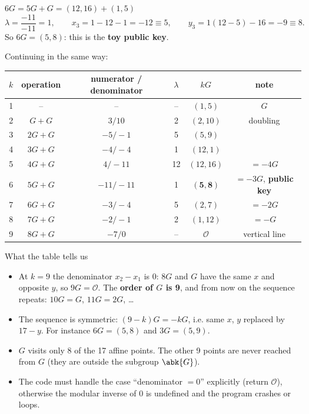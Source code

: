 \begin{framedex}{$6G = 5G + G = (12,16) + (1,5)$}
  \[
    \lambda = \frac{-11}{-11} = 1, \qquad
    x_3 = 1 - 12 - 1 = -12 \equiv 5, \qquad
    y_3 = 1(12 - 5) - 16 = -9 \equiv 8 .
  \]
  So $6G = (5, 8)$: this is the \textbf{toy public key}.
\end{framedex}

Continuing in the same way:

\begin{center}
  \begin{tabular}{c c c c c c}
    \toprule
    $k$ & operation & numerator / denominator & $\lambda$ & $kG$ & note \\
    \midrule
    1 & -- & -- & -- & $(1, 5)$ & $G$ \\
    2 & $G + G$ & $3 / 10$ & 2 & $(2, 10)$ & doubling \\
    3 & $2G + G$ & $-5 / -1$ & 5 & $(5, 9)$ & \\
    4 & $3G + G$ & $-4 / -4$ & 1 & $(12, 1)$ & \\
    5 & $4G + G$ & $4 / -11$ & 12 & $(12, 16)$ & $= -4G$ \\
    6 & $5G + G$ & $-11 / -11$ & 1 & $\mathbf{(5, 8)}$ & $= -3G$, \textbf{public key} \\
    7 & $6G + G$ & $-3 / -4$ & 5 & $(2, 7)$ & $= -2G$ \\
    8 & $7G + G$ & $-2 / -1$ & 2 & $(1, 12)$ & $= -G$ \\
    9 & $8G + G$ & $-7 / 0$ & -- & $\mathcal{O}$ & vertical line \\
    \bottomrule
  \end{tabular}
\end{center}

\begin{framedobs}{What the table tells us}
  \begin{itemize}
    \item At $k = 9$ the denominator $x_2 - x_1$ is $0$: $8G$ and $G$ have the same $x$ and opposite $y$, so $9G = \mathcal{O}$. The \textbf{order of $G$ is 9}, and from now on the sequence repeats: $10G = G$, $11G = 2G$, \ldots
    \item The sequence is symmetric: $(9 - k) G = -kG$, i.e. same $x$, $y$ replaced by $17 - y$. For instance $6G = (5,8)$ and $3G = (5,9)$.
    \item $G$ visits only 8 of the 17 affine points. The other 9 points are never reached from $G$ (they are outside the subgroup $\abk{G}$).
    \item The code must handle the case ``denominator $= 0$'' explicitly (return $\mathcal{O}$), otherwise the modular inverse of 0 is undefined and the program crashes or loops.
  \end{itemize}
\end{framedobs}

